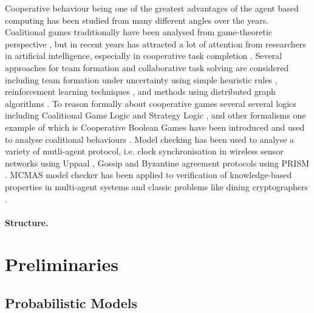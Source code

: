 \documentclass{llncs}
\begin{document}
Cooperative behaviour being one of the greatest advantages of the agent based computing has been studied from many different angles over the years. Coalitional games traditionally have been analysed from game-theoretic perspective \cite{osborne1994course}, but in recent years has attracted a lot of attention from researchers in artificial intelligence, especially in cooperative task completion \cite{shehory1998methods}. Several approaches for team formation and collaborative task solving are considered including team formation under uncertainty using simple heuristic rules \cite{kraus2003coalition}, reinforcement learning techniques \cite{abdallah2004organization}, and methods using distributed graph algorithms \cite{manisterski2006forming}. To reason formally about cooperative games several several logics  including Coalitional Game Logic \cite{agotnes2009reasoning} and Strategy Logic \cite{chatterjee2007strategy}, and other formalisms one example of which is Cooperative Boolean Games \cite{dunne2008cooperative} have been introduced and used to analyse coalitional behaviours \cite{bonzon2007efficient}. Model checking has been used to analyse a variety of mutli-agent protocol, i.e. clock synchronisation in wireless sensor networks using Uppaal \cite{heidarian2009analysis}, Gossip  \cite{KNP08d} and Byzantine agreement protocols  \cite{KN02} using PRISM   \cite{KNP11}. MCMAS model checker has been applied to verification of knowledge-based properties in multi-agent systems and classic problems like dining cryptographers \cite{lomuscio2006mcmas}.


\paragraph{Structure.}


\section{Preliminaries}


\subsection{Probabilistic Models}
\end{document}
